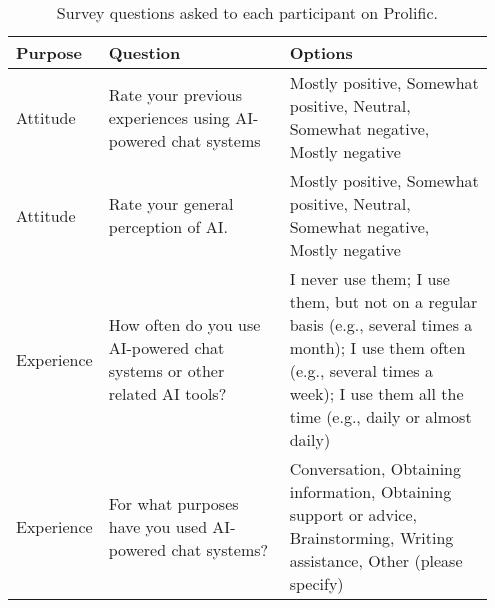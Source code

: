 \documentclass[11pt]{article}
\begin{document}
\begin{table*}[ht]
\scriptsize
\begin{tabular}{p{0.1\linewidth}|p{0.4\linewidth}|p{0.45\linewidth}}\hline
\textbf{Purpose}   & \textbf{Question}                                                                          & \textbf{Options}                                           \\\hline
Attitude          & Rate your previous experiences using AI-powered chat systems                               & Mostly positive, Somewhat positive, Neutral, Somewhat negative, Mostly negative           \\\hline
Attitude           & Rate your general perception of AI.                                                        & Mostly positive, Somewhat positive, Neutral, Somewhat negative, Mostly negative           \\\hline
Experience         & How often do you use AI-powered chat systems or other related AI tools?                    & I never use them; I use them, but not on a regular basis (e.g., several times a month); I use them often (e.g., several times a week); I use them all the time (e.g., daily or almost daily) \\\hline
Experience         & For what purposes have you used AI-powered chat systems?                                    & Conversation, Obtaining information, Obtaining support or advice, Brainstorming, Writing assistance, Other (please specify)                                                                  \\\hline
\end{tabular}
 \caption{Survey questions asked to each participant on Prolific.}
 \label{tab:survey}
\end{table*}
\end{document}
